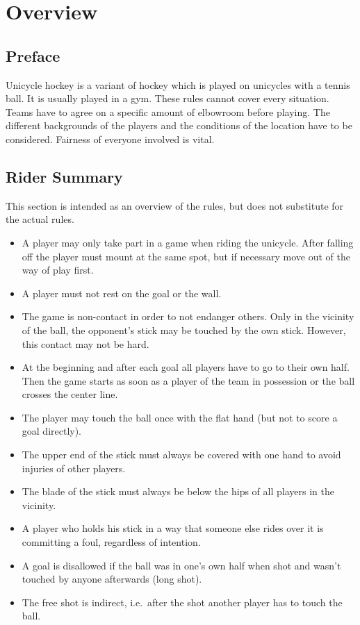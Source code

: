 \chapter{Overview}

\section{Preface}

Unicycle hockey is a variant of hockey which is played on unicycles with a tennis ball.
It is usually played in a gym.
These rules cannot cover every situation.
Teams have to agree on a specific amount of elbowroom before playing.
The different backgrounds of the players and the conditions of the location have to be considered.
Fairness of everyone involved is vital.

\section{Rider Summary}

This section is intended as an overview of the rules, but does not substitute for the actual rules.
\begin{itemize}
\item A player may only take part in a game when riding the unicycle.
 After falling off the player must mount at the same spot, but if necessary move out of the way of play first.
\item A player must not rest on the goal or the wall.
\item The game is non-contact in order to not endanger others.
  Only in the vicinity of the ball, the opponent's stick may be touched by the own stick.
  However, this contact may not be hard.
\item At the beginning and after each goal all players have to go to their own half.
  Then the game starts as soon as a player of the team in possession or the ball crosses the center line.
\item The player may touch the ball once with the flat hand (but not to score a goal directly).
\item The upper end of the stick must always be covered with one hand to avoid injuries of other players.
\item The blade of the stick must always be below the hips of all players in the vicinity.
\item A player who holds his stick in a way that someone else rides over it is committing a foul, regardless of intention.
\item A goal is disallowed if the ball was in one's own half when shot and wasn't touched by anyone afterwards (long shot).
\item The free shot is indirect, i.e.\ after the shot another player has to touch the ball.
\end{itemize}

